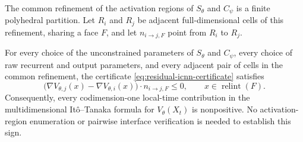 The common refinement of the activation regions of \(S_\theta\) and
\(C_\psi\) is a finite polyhedral partition.  Let \(R_i\) and \(R_j\) be
adjacent full-dimensional cells of this refinement, sharing a face \(F\), and
let \(n_{i\to j,F}\) point from \(R_i\) to \(R_j\).

\begin{theorem}
\label{thm:deep-relu-icnn-local-time}
For every choice of the unconstrained parameters of \(S_\theta\) and
\(C_\psi\), every choice of raw recurrent and output parameters, and every
adjacent pair of cells in the common refinement, the certificate
\eqref{eq:residual-icnn-certificate} satisfies
\begin{equation}
    \bigl(
        \nabla V_{\theta,j}(x)-\nabla V_{\theta,i}(x)
    \bigr)
    \cdot n_{i\to j,F}
    \leq 0,
    \qquad x\in\operatorname{relint}(F).
    \label{eq:local-time-condition-by-construction}
\end{equation}
Consequently, every codimension-one local-time contribution in the
multidimensional It\^o--Tanaka formula for \(V_\theta(X_t)\) is nonpositive.
No activation-region enumeration or pairwise interface verification is needed
to establish this sign.
\end{theorem}

